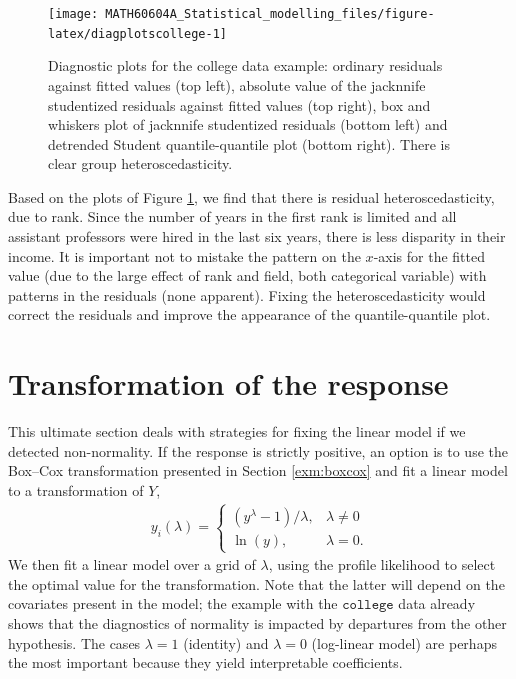 \documentclass[
  11pt,
  letterpaper,
]{book}
\theoremstyle{definition}
\theoremstyle{definition}
\theoremstyle{definition}
\theoremstyle{definition}
\theoremstyle{remark}
\begin{document}
\begin{figure}

{\centering \texttt{[image: MATH60604A\_Statistical\_modelling\_files/figure-latex/diagplotscollege-1]} 

}

\caption{Diagnostic plots for the college data example: ordinary residuals against fitted values (top left), absolute value of the jacknnife studentized residuals against fitted values (top right), box and whiskers plot of jacknnife studentized residuals (bottom left) and detrended Student quantile-quantile plot (bottom right). There is clear group heteroscedasticity.}\label{fig:diagplotscollege}
\end{figure}

Based on the plots of Figure \ref{fig:diagplotscollege}, we find that there is residual heteroscedasticity, due to rank. Since the number of years in the first rank is limited and all assistant professors were hired in the last six years, there is less disparity in their income. It is important not to mistake the pattern on the \(x\)-axis for the fitted value (due to the large effect of rank and field, both categorical variable) with patterns in the residuals (none apparent). Fixing the heteroscedasticity would correct the residuals and improve the appearance of the quantile-quantile plot.

\hypertarget{transformation-response}{%
\section{Transformation of the response}\label{transformation-response}}

This ultimate section deals with strategies for fixing the linear model if we detected non-normality. If the response is strictly positive, an option is to use the Box--Cox transformation presented in Section \ref{exm:boxcox} and fit a linear model to a transformation of \(Y\),
\begin{align*}
y_i(\lambda)= \begin{cases}
(y^{\lambda}-1)/\lambda, & \lambda \neq 0\\
\ln(y), & \lambda=0.
\end{cases}
\end{align*}
We then fit a linear model over a grid of \(\lambda\), using the profile likelihood to select the optimal value for the transformation. Note that the latter will depend on the covariates present in the model; the example with the \(\texttt{college}\) data already shows that the diagnostics of normality is impacted by departures from the other hypothesis. The cases \(\lambda=1\) (identity) and \(\lambda=0\) (log-linear model) are perhaps the most important because they yield interpretable coefficients.
\end{document}

